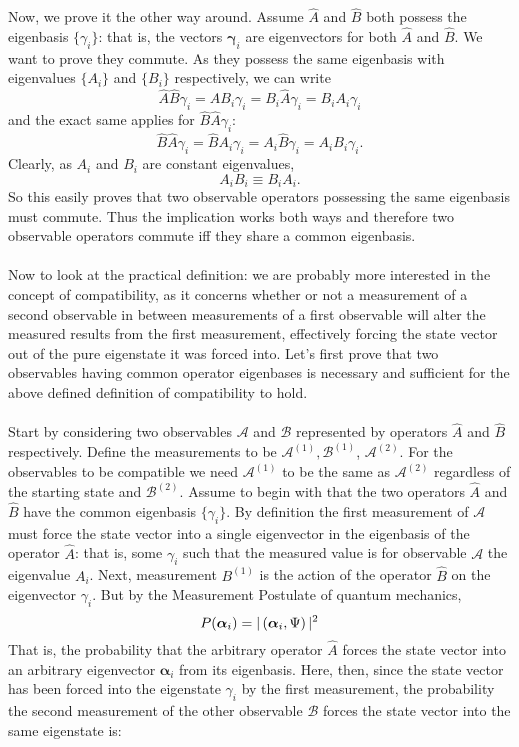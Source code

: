 Now, we prove it the other way around. Assume $\hat{A}$ and $\hat{B}$ both possess the eigenbasis $\{\gamma_{i}\}$: that is, the vectors $\bm{\gamma}_{i}$ are eigenvectors for both $\hat{A}$ and $\hat{B}$. We want to prove they commute. As they possess the same eigenbasis with eigenvalues $\{A_{i}\}$ and $\{B_{i}\}$ respectively, we can write
$$
\hat{A}\hat{B}\gamma_{i}=\hat{A}B_{i}\gamma_{i}=B_{i}\hat{A}\gamma_{i}=B_{i}A_{i}\gamma_{i}
$$
and the exact same applies for $\hat{B}\hat{A}\gamma_{i}$:
$$
\hat{B}\hat{A}\gamma_{i}=\hat{B}A_{i}\gamma_{i}=A_{i}\hat{B}\gamma_{i}=A_{i}B_{i}\gamma_{i}.
$$
Clearly, as $A_{i}$ and $B_{i}$ are constant eigenvalues, 
$$
A_{i}B_{i}\equiv B_{i}A_{i}.
$$
So this easily proves that two observable operators possessing the same eigenbasis must commute. Thus the implication works both ways and therefore two observable operators commute iff they share a common eigenbasis.
\\\\
Now to look at the practical definition: we are probably more interested in the concept of compatibility, as it concerns whether or not a measurement of a second observable in between measurements of a first observable will alter the measured results from the first measurement, effectively  forcing the state vector out of the pure eigenstate it was forced into. Let's first prove that two observables having common operator eigenbases is necessary and sufficient for the above defined definition of compatibility to hold.
\\\\
Start by considering two observables $\mathcal{A}$ and $\mathcal{B}$ represented by operators $\hat{A}$ and $\hat{B}$ respectively. Define the measurements to be $\mathcal{A}^{(1)},\mathcal{B}^{(1)}$, $\mathcal{A}^{(2)}$. For the observables to be compatible we need $\mathcal{A}^{(1)}$ to be the same as $\mathcal{A}^{(2)}$ regardless of the starting state and $\mathcal{B}^{(2)}$. Assume to begin with that the two operators $\hat{A}$ and $\hat{B}$ have the common eigenbasis $\{\gamma_{i}\}$. By definition the first measurement of $\mathcal{A}$ must force the state vector into a single eigenvector in the eigenbasis of the operator $\hat{A}$: that is, some $\gamma_{i}$ such that the measured value is for observable $\mathcal{A}$ the eigenvalue $A_{i}$. Next, measurement ${{B}}^{(1)}$ is the action of the operator $\hat{B}$ on the eigenvector $\gamma_{i}$. But by the Measurement Postulate of quantum mechanics,
$$
P(\bm{\alpha}_{i})=|\left(\bm{\alpha}_{i},\Psi\right)|^2
$$
That is, the probability that the arbitrary operator $\hat{A}$ forces the state vector into an arbitrary eigenvector $\bm{\alpha}_{i}$ from its eigenbasis. Here, then, since the state vector has been forced into the eigenstate $\gamma_{i}$ by the first measurement, the probability the second measurement of the other observable $\mathcal{B}$ forces the state vector into the same eigenstate is:
